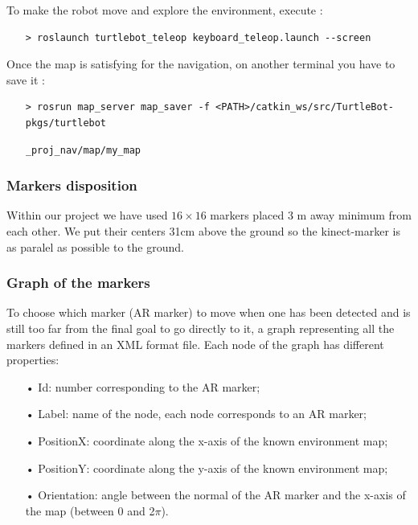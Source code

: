 \documentclass[10pt,a4paper]{article}
\begin{document}
To make the robot move and explore the environment, execute :

\begin{itemize}
\item[]  \begin{verbatim}> roslaunch turtlebot_teleop keyboard_teleop.launch --screen \end{verbatim}
\end{itemize}

Once the map is satisfying for the navigation, on another terminal you have to save it :

\begin{itemize}
\item[]  \begin{verbatim}> rosrun map_server map_saver -f <PATH>/catkin_ws/src/TurtleBot-pkgs/turtlebot\end{verbatim}
\item[]  \begin{verbatim}_proj_nav/map/my_map\end{verbatim}

\end{itemize}

\subsubsection{Markers disposition}
 
Within our project we have used  $16 \times 16$ markers placed 3 m away minimum from each other. We put their centers 31cm above the ground so the kinect-marker is as paralel as possible to the ground.

\subsubsection{Graph of the markers}

To choose which marker (AR marker) to move when one has been detected and is still too far from the final goal to go directly to it, a graph representing all the markers defined in an XML format file. Each node of the graph has different properties:

\begin{itemize}
\item[•] Id: number corresponding to the AR marker;
\item[•] Label: name of the node, each node corresponds to an AR marker;
\item[•] PositionX: coordinate along the x-axis of the known environment map;
\item[•] PositionY: coordinate along the y-axis of the known environment map;
\item[•] Orientation: angle between the normal of the AR marker and the x-axis of the map (between 0 and 2$\pi$).
\end{itemize}
\end{document}
